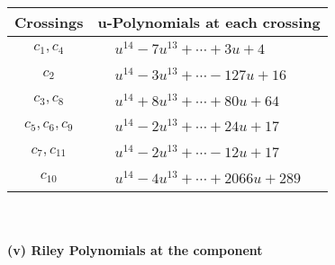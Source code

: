 \documentclass[1p]{elsarticle_modified}
\theoremstyle{definition}
\begin{document}
\begin{tabular}{m{50pt}|m{274pt}}
Crossings & \hspace{64pt}u-Polynomials at each crossing \\
\hline $$\begin{aligned}c_{1},c_{4}\end{aligned}$$&$\begin{aligned}
&u^{14}-7 u^{13}+\cdots+3 u+4
\end{aligned}$\\
\hline $$\begin{aligned}c_{2}\end{aligned}$$&$\begin{aligned}
&u^{14}-3 u^{13}+\cdots-127 u+16
\end{aligned}$\\
\hline $$\begin{aligned}c_{3},c_{8}\end{aligned}$$&$\begin{aligned}
&u^{14}+8 u^{13}+\cdots+80 u+64
\end{aligned}$\\
\hline $$\begin{aligned}c_{5},c_{6},c_{9}\end{aligned}$$&$\begin{aligned}
&u^{14}-2 u^{13}+\cdots+24 u+17
\end{aligned}$\\
\hline $$\begin{aligned}c_{7},c_{11}\end{aligned}$$&$\begin{aligned}
&u^{14}-2 u^{13}+\cdots-12 u+17
\end{aligned}$\\
\hline $$\begin{aligned}c_{10}\end{aligned}$$&$\begin{aligned}
&u^{14}-4 u^{13}+\cdots+2066 u+289
\end{aligned}$\\
\hline
\end{tabular}\\~\\
\newpage\renewcommand{\arraystretch}{1}
\flushleft \textbf{(v) Riley Polynomials at the component}\newline \\
\end{document}
